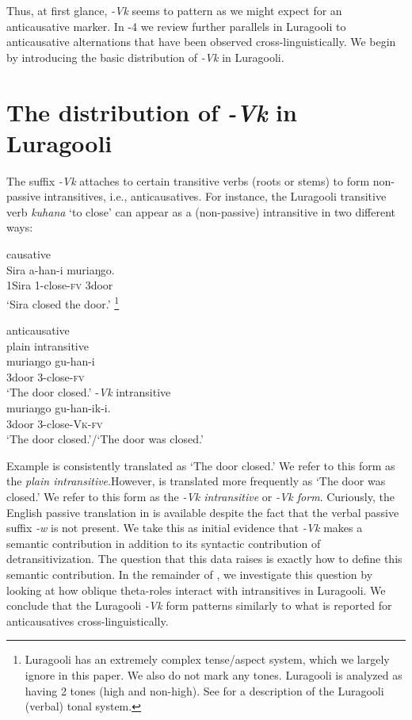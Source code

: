 \documentclass[output=paper]{langsci/lanmgscibook}
\begin{document}
Thus, at first glance, \textit{-Vk} seems to pattern as we might expect for an anticausative marker. In -4 we review further parallels in Luragooli to anticausative alternations that have been observed cross-linguistically. We begin  by introducing the basic distribution of \textit{-Vk} in Luragooli.

\section{The distribution of \textit{-Vk} in Luragooli}\label{sec:gluckman:3}

The suffix \textit{-Vk} attaches to certain transitive verbs (roots or stems) to form non-passive intransitives, i.e., anticausatives. For instance, the Luragooli transitive verb \textit{kuhana} ‘to close’ can appear as a (non-passive) intransitive in two different ways:

\ea\label{ex:gluckman:4}{causative}\\
\gll Sira    a-han-i      muriaŋgo.      \\
     1Sira 1-close-\textsc{fv}  3door\\
\glt ‘Sira closed the door.’
\footnote{Luragooli has an extremely complex tense/aspect system, which we largely ignore in this paper. We also do not mark any tones. Luragooli is analyzed as having 2 tones (high and non-high). See \citet{SamuelsPaster2015} for a description of the Luragooli (verbal) tonal system.}
\z

\ea\label{ex:gluckman:5} 
{anticausative}\\
\ea\label{ex:gluckman:5a}{plain intransitive}\\ 
\gll muriaŋgo gu-han-i       \\
       3door       3-close-\textsc{fv}\\ 
\glt ‘The door closed.’
\ex\label{ex:gluckman:5b}{-\textit{Vk} intransitive}\\ 
\gll muriaŋgo gu-han-ik-i.       \\
       3door         3-close-\textsc{Vk}-\textsc{fv}\\
\glt ‘The door closed.’/‘The door was closed.’
\z
\z

Example  is consistently translated as ‘The door closed.’ We refer to this form as the \textit{plain intransitive}.However,  is translated more frequently as ‘The door was closed.’ We refer to this form as the \textit{-Vk intransitive} or \textit{-Vk form}. Curiously, the English passive translation in  is available despite the fact that the verbal passive suffix \textit{-w} is not present. We take this as initial evidence that \textit{-Vk} makes a semantic contribution in addition to its syntactic contribution of detransitivization. The question that this data raises is exactly how to define this semantic contribution. In the remainder of , we investigate this question by looking at how oblique theta-roles interact with intransitives in Luragooli. We conclude that the Luragooli \textit{-Vk} form patterns similarly to what is reported for anticausatives cross-linguistically.
\end{document}
